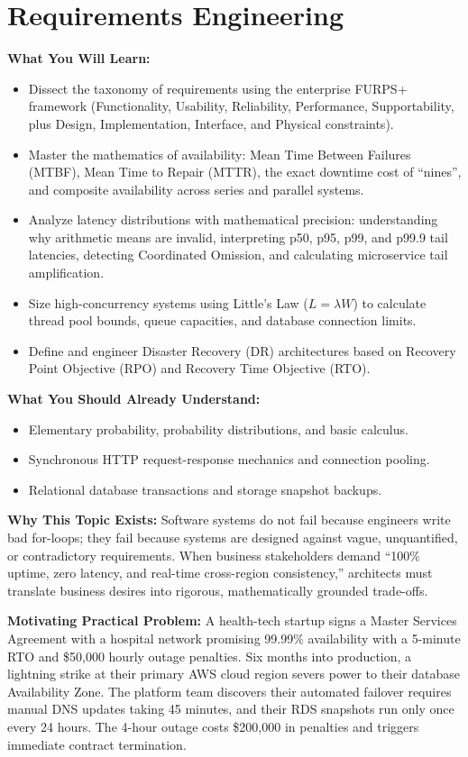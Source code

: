 \chapter{Requirements Engineering}
\label{ch:requirements-engineering}

\begin{chaptergoalsbox}
\textbf{What You Will Learn:}
\begin{itemize}[leftmargin=12pt]
  \item Dissect the taxonomy of requirements using the enterprise FURPS+ framework (Functionality, Usability, Reliability, Performance, Supportability, plus Design, Implementation, Interface, and Physical constraints).
  \item Master the mathematics of availability: Mean Time Between Failures (MTBF), Mean Time to Repair (MTTR), the exact downtime cost of ``nines'', and composite availability across series and parallel systems.
  \item Analyze latency distributions with mathematical precision: understanding why arithmetic means are invalid, interpreting p50, p95, p99, and p99.9 tail latencies, detecting Coordinated Omission, and calculating microservice tail amplification.
  \item Size high-concurrency systems using Little's Law ($L = \lambda W$) to calculate thread pool bounds, queue capacities, and database connection limits.
  \item Define and engineer Disaster Recovery (DR) architectures based on Recovery Point Objective (RPO) and Recovery Time Objective (RTO).
\end{itemize}

\textbf{What You Should Already Understand:}
\begin{itemize}[leftmargin=12pt]
  \item Elementary probability, probability distributions, and basic calculus.
  \item Synchronous HTTP request-response mechanics and connection pooling.
  \item Relational database transactions and storage snapshot backups.
\end{itemize}

\textbf{Why This Topic Exists:}
Software systems do not fail because engineers write bad for-loops; they fail because systems are designed against vague, unquantified, or contradictory requirements. When business stakeholders demand ``100\% uptime, zero latency, and real-time cross-region consistency,'' architects must translate business desires into rigorous, mathematically grounded trade-offs.

\textbf{Motivating Practical Problem:}
A health-tech startup signs a Master Services Agreement with a hospital network promising 99.99\% availability with a 5-minute RTO and \$50,000 hourly outage penalties. Six months into production, a lightning strike at their primary AWS cloud region severs power to their database Availability Zone. The platform team discovers their automated failover requires manual DNS updates taking 45 minutes, and their RDS snapshots run only once every 24 hours. The 4-hour outage costs \$200,000 in penalties and triggers immediate contract termination.
\end{chaptergoalsbox}

